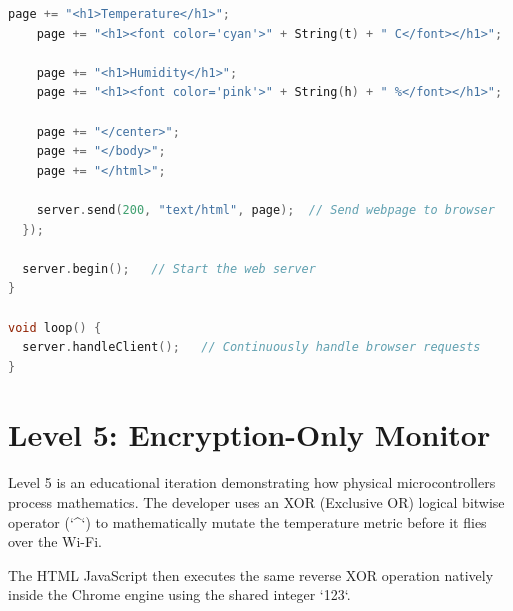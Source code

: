 \begin{lstlisting}[language=C++, caption=23022026\_Level\_4\_Password.ino]
    page += "<h1>Temperature</h1>";
    page += "<h1><font color='cyan'>" + String(t) + " C</font></h1>";

    page += "<h1>Humidity</h1>";
    page += "<h1><font color='pink'>" + String(h) + " %</font></h1>";

    page += "</center>";
    page += "</body>";
    page += "</html>";

    server.send(200, "text/html", page);  // Send webpage to browser
  });

  server.begin();   // Start the web server
}

void loop() {
  server.handleClient();   // Continuously handle browser requests
}
\end{lstlisting}

\section{Level 5: Encryption-Only Monitor}
Level 5 is an educational iteration demonstrating how physical microcontrollers process mathematics. The developer uses an XOR (Exclusive OR) logical bitwise operator (`^`) to mathematically mutate the temperature metric before it flies over the Wi-Fi. 

The HTML JavaScript then executes the same reverse XOR operation natively inside the Chrome engine using the shared integer `123`.

